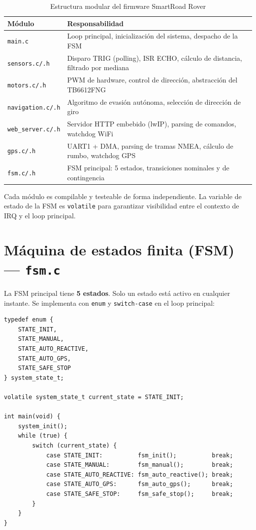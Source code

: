 \documentclass[12pt]{report}
\begin{document}
\begin{table}[H]
\centering
\renewcommand{\arraystretch}{0.85}
\begin{tabular}{|l|p{8.5cm}|}
\hline
\textbf{Módulo} & \textbf{Responsabilidad} \\
\hline
\texttt{main.c} & Loop principal, inicialización del sistema, despacho de la FSM \\
\hline
\texttt{sensors.c/.h} & Disparo TRIG (polling), ISR ECHO, cálculo de distancia, filtrado por mediana \\
\hline
\texttt{motors.c/.h} & PWM de hardware, control de dirección, abstracción del TB6612FNG \\
\hline
\texttt{navigation.c/.h} & Algoritmo de evasión autónoma, selección de dirección de giro \\
\hline
\texttt{web\_server.c/.h} & Servidor HTTP embebido (lwIP), parsing de comandos, watchdog WiFi \\
\hline
\texttt{gps.c/.h} & UART1 + DMA, parsing de tramas NMEA, cálculo de rumbo, watchdog GPS \\
\hline
\texttt{fsm.c/.h} & FSM principal: 5 estados, transiciones nominales y de contingencia \\
\hline
\end{tabular}
\caption{Estructura modular del firmware SmartRoad Rover}
\end{table}

Cada módulo es compilable y testeable de forma independiente. La variable de estado de la FSM es \texttt{volatile} para garantizar visibilidad entre el contexto de IRQ y el loop principal.

\section{Máquina de estados finita (FSM) — \texttt{fsm.c}}

La FSM principal tiene \textbf{5 estados}. Solo un estado está activo en cualquier instante. Se implementa con \texttt{enum} y \texttt{switch-case} en el loop principal:

\begin{lstlisting}[style=cstyle]
typedef enum {
    STATE_INIT,
    STATE_MANUAL,
    STATE_AUTO_REACTIVE,
    STATE_AUTO_GPS,
    STATE_SAFE_STOP
} system_state_t;

volatile system_state_t current_state = STATE_INIT;

int main(void) {
    system_init();
    while (true) {
        switch (current_state) {
            case STATE_INIT:          fsm_init();          break;
            case STATE_MANUAL:        fsm_manual();        break;
            case STATE_AUTO_REACTIVE: fsm_auto_reactive(); break;
            case STATE_AUTO_GPS:      fsm_auto_gps();      break;
            case STATE_SAFE_STOP:     fsm_safe_stop();     break;
        }
    }
}
\end{lstlisting}
\end{document}
